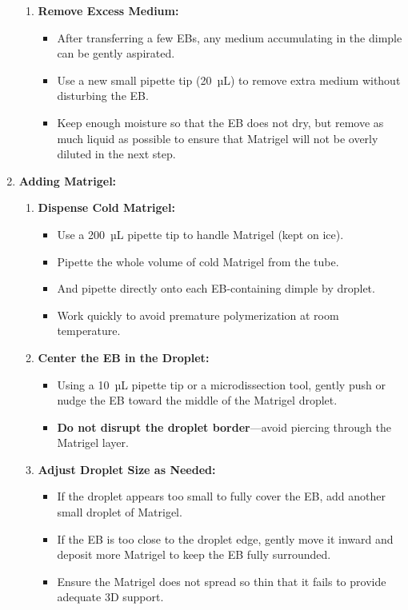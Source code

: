 \documentclass[11pt]{article}
\begin{document}
\begin{enumerate}[leftmargin=*]
\begin{enumerate}[leftmargin=*]
        \item \textbf{Remove Excess Medium:}
        \begin{itemize}[leftmargin=*]
            \item After transferring a few EBs, any medium accumulating in the dimple can be gently aspirated. 
            \item Use a new small pipette tip (20~µL) to remove extra medium without disturbing the EB.
            \item Keep enough moisture so that the EB does not dry, but remove as much liquid as possible to ensure that Matrigel will not be overly diluted in the next step.
        \end{itemize}
    \end{enumerate}

\item \textbf{Adding Matrigel:}
    \begin{enumerate}[leftmargin=*]
        \item \textbf{Dispense Cold Matrigel:}
        \begin{itemize}[leftmargin=*]
            \item Use a 200~µL pipette tip to handle Matrigel (kept on ice).
            \item Pipette the whole volume of cold Matrigel from the tube.
            \item And pipette directly onto each EB-containing dimple by droplet.
            \item Work quickly to avoid premature polymerization at room temperature.
        \end{itemize}

        \item \textbf{Center the EB in the Droplet:}
        \begin{itemize}[leftmargin=*]
            \item Using a 10~µL pipette tip or a microdissection tool, gently push or nudge the EB toward the middle of the Matrigel droplet.
            \item \textbf{Do not disrupt the droplet border}—avoid piercing through the Matrigel layer.
        \end{itemize}

        \item \textbf{Adjust Droplet Size as Needed:}
        \begin{itemize}[leftmargin=*]
            \item If the droplet appears too small to fully cover the EB, add another small droplet of Matrigel.
            \item If the EB is too close to the droplet edge, gently move it inward and deposit more Matrigel to keep the EB fully surrounded.
            \item Ensure the Matrigel does not spread so thin that it fails to provide adequate 3D support.
        \end{itemize}
    \end{enumerate}


\end{enumerate}
\end{document}
